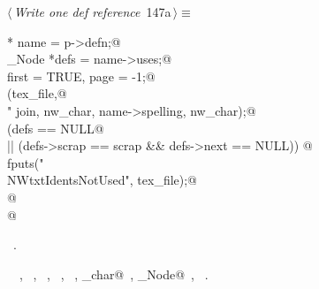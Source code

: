 \documentclass[a4paper]{report}
\begin{document}
\begin{flushleft} \small
\begin{minipage}{\linewidth}\label{scrap321}\raggedright\small
{} $\langle\,${\it Write one def reference}\nobreak\ {\footnotesize {147a}}$\,\rangle\equiv$
\vspace{-1ex}
\begin{list}{}{} \item
\mbox{}\verb@Name * name = p->defn;@\\
\mbox{}\verb@Scrap_Node *defs = name->uses;@\\
\mbox{}\verb@int first = TRUE, page = -1;@\\
\mbox{}\verb@fprintf(tex_file,@\\
\mbox{}\verb@        "%c \\verb%c%s%c\\nobreak\\ ",@\\
\mbox{}\verb@        join, nw_char, name->spelling, nw_char);@\\
\mbox{}\verb@if (defs == NULL@\\
\mbox{}\verb@    || (defs->scrap == scrap && defs->next == NULL)) {@\\
\mbox{}\verb@  fputs("\\NWtxtIdentsNotUsed", tex_file);@\\
\mbox{}\verb@}@\\
\mbox{}@\\
\mbox{}\verb@@{\NWsep}
\end{list}
\vspace{-1.5ex}
\footnotesize
\begin{list}{}{\setlength{\itemsep}{-\parsep}\setlength{\itemindent}{-\leftmargin}}
\item \NWtxtMacroRefIn\ .
\item \NWtxtIdentsUsed\nobreak\  \verb@FALSE@\nobreak\ , \verb@first@\nobreak\ , \verb@fprintf@\nobreak\ , \verb@fputs@\nobreak\ , \verb@Name@\nobreak\ , \verb@nw_char@\nobreak\ , \verb@Scrap_Node@\nobreak\ , \verb@TRUE@\nobreak\ .
\item{}
\end{list}
\end{minipage}\vspace{4ex}
\end{flushleft}
\end{document}
